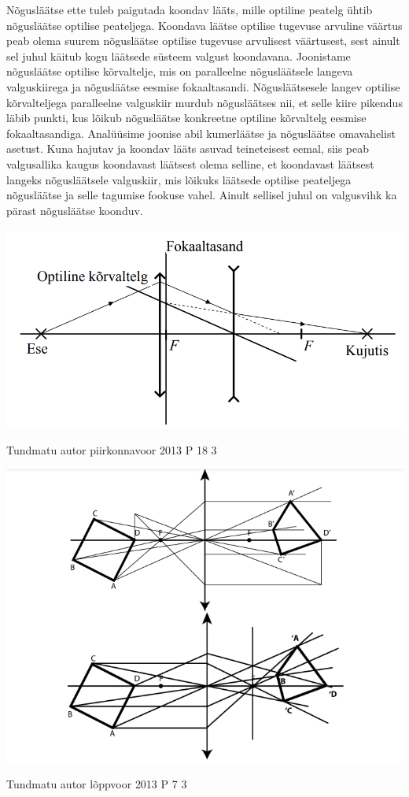 \documentclass[11pt]{article}
\begin{document}
{{\ifSolution
Nõgusläätse ette tuleb paigutada koondav lääts, mille optiline peatelg ühtib nõgusläätse optilise peateljega. Koondava läätse optilise tugevuse arvuline väärtus peab olema suurem nõgusläätse optilise tugevuse arvulisest väärtusest, sest ainult sel juhul käitub kogu läätsede süsteem valgust koondavana. Joonistame nõgusläätse optilise kõrvaltelje, mis on paralleelne nõgusläätsele langeva valguskiirega ja nõgusläätse eesmise fokaaltasandi. Nõgusläätsesele langev optilise kõrvalteljega paralleelne valguskiir murdub nõgusläätses nii, et selle kiire pikendus läbib punkti, kus lõikub nõgusläätse konkreetne optiline kõrvaltelg eesmise fokaaltasandiga. Analüüsime joonise abil kumerläätse ja nõgusläätse omavahelist asetust. Kuna hajutav ja koondav lääts asuvad teineteisest eemal, siis peab valgusallika kaugus koondavast läätsest olema selline, et koondavast läätsest langeks nõgusläätsele valguskiir, mis lõikuks läätsede optilise peateljega nõgusläätse ja selle tagumise fookuse vahel. Ainult sellisel juhul on valgusvihk ka pärast nõgusläätse koonduv.
\begin{center}
	\includegraphics[width=0.5\linewidth]{2012-v2p-10-lah.PNG}
\end{center}
\fi
}


{Tundmatu autor} %
{piirkonnavoor} %
{2013} %
{P 18} %
{3} %
{

\ifSolution
\begin{center}
	\includegraphics[width=0.5\linewidth]{2013-v2p-18-lah.PNG}
\end{center}
\fi
}

{Tundmatu autor} %
{lõppvoor} %
{2013} %
{P 7} %
{3} %
{

}}
\end{document}
